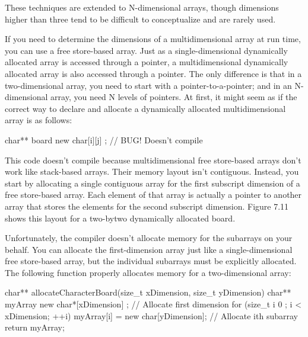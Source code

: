 These techniques are extended to N-dimensional arrays, though dimensions higher than three tend to be difficult to conceptualize and are rarely used.




If you need to determine the dimensions of a multidimensional array at run time, you can use a free store-based array. Just as a single-dimensional dynamically allocated array is accessed through a pointer, a multidimensional dynamically allocated array is also accessed through a pointer. The only difference is that in a two-dimensional array, you need to start with a pointer-to-a-pointer; and in an N-dimensional array, you need N levels of pointers. At first, it might seem as if the correct way to declare and allocate a dynamically allocated multidimensional array is as follows:

\begin{cpp}
char** board { new char[i][j] }; // BUG! Doesn't compile
\end{cpp}

This code doesn’t compile because multidimensional free store-based arrays don’t work like stack-based arrays. Their memory layout isn’t contiguous. Instead, you start by allocating a single contiguous array for the first subscript dimension of a free store-based array. Each element of that array is actually a pointer to another array that stores the elements for the second subscript dimension. Figure 7.11 shows this layout for a two-bytwo dynamically allocated board.


Unfortunately, the compiler doesn’t allocate memory for the subarrays on your behalf. You can allocate the first-dimension array just like a single-dimensional free store-based array, but the individual subarrays must be explicitly allocated. The following function properly allocates memory for a two-dimensional array:

\begin{cpp}
char** allocateCharacterBoard(size_t xDimension, size_t yDimension)
{
    char** myArray { new char*[xDimension] }; // Allocate first dimension
    for (size_t i { 0 }; i < xDimension; ++i) {
        myArray[i] = new char[yDimension]; // Allocate ith subarray
    }
    return myArray;
}
\end{cpp}

